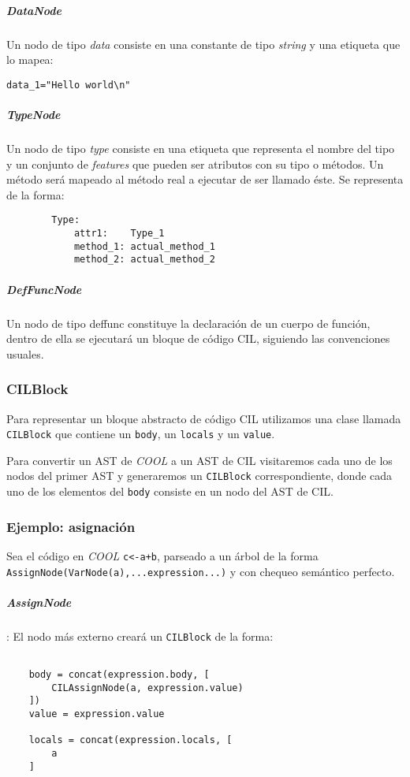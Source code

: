 \documentclass[a4paper,10pt,twocolumn]{article}
\begin{document}
\subparagraph{DataNode}

Un nodo de tipo \textit{data} consiste en una constante de tipo \textit{string} y una etiqueta que lo mapea:

\begin{center}
	\lstinline|data_1="Hello world\n"|
\end{center}

\subparagraph{TypeNode}

Un nodo de tipo \textit{type} consiste en una etiqueta que representa el nombre del tipo y un conjunto de \textit{features} que pueden ser atributos con su tipo o métodos. Un método será mapeado al método real a ejecutar de ser llamado éste. Se representa de la forma:

\begin{center}
	\begin{lstlisting}
		Type:
			attr1: 	  Type_1
			method_1: actual_method_1
			method_2: actual_method_2
	\end{lstlisting}
\end{center}

\subparagraph{DefFuncNode}
Un nodo de tipo {deffunc} constituye la declaración de un cuerpo de función, dentro de ella se ejecutará un bloque de código CIL, siguiendo las convenciones usuales. 


\subsubsection{CILBlock}
Para representar un bloque abstracto de código CIL utilizamos una clase llamada \lstinline|CILBlock| que contiene un \lstinline|body|, un \lstinline|locals| y un \lstinline|value|. 

Para convertir un AST de \textit{COOL} a un AST de CIL visitaremos cada uno de los nodos del primer AST y generaremos un \lstinline|CILBlock| correspondiente, donde cada uno de los elementos del \lstinline|body| consiste en un nodo del AST de CIL.

\subsubsection{Ejemplo: asignación}
Sea el código en \textit{COOL} \lstinline|c<-a+b|, parseado a un árbol de la forma \lstinline|AssignNode(VarNode(a),...expression...)| y con chequeo semántico perfecto. 

\subparagraph{AssignNode}: El nodo más externo creará un \lstinline|CILBlock| de la forma:
	\begin{lstlisting}
	
	body = concat(expression.body, [ 
		CILAssignNode(a, expression.value)
	])
	value = expression.value
	
	locals = concat(expression.locals, [
		a
	]
	
	\end{lstlisting}
\end{document}
